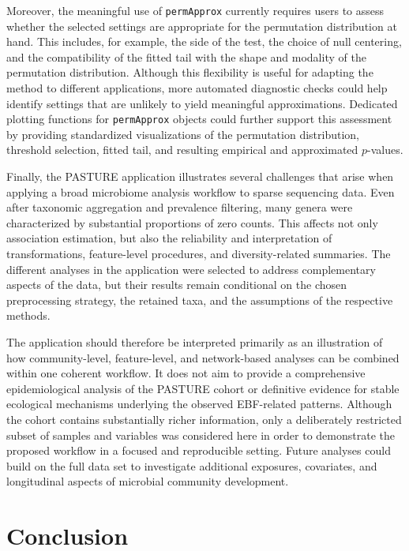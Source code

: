 Moreover, the meaningful use of \texttt{permApprox} currently requires users to assess whether the selected settings are appropriate for the permutation distribution at hand. This includes, for example, the side of the test, the choice of null centering, and the compatibility of the fitted tail with the shape and modality of the permutation distribution. Although this flexibility is useful for adapting the method to different applications, more automated diagnostic checks could help identify settings that are unlikely to yield meaningful approximations. Dedicated plotting functions for \texttt{permApprox} objects could further support this assessment by providing standardized visualizations of the permutation distribution, threshold selection, fitted tail, and resulting empirical and approximated $p$-values.

Finally, the PASTURE application illustrates several challenges that arise when applying a broad microbiome analysis workflow to sparse sequencing data. Even after taxonomic aggregation and prevalence filtering, many genera were characterized by substantial proportions of zero counts. This affects not only association estimation, but also the reliability and interpretation of transformations, feature-level procedures, and diversity-related summaries. The different analyses in the application were selected to address complementary aspects of the data, but their results remain conditional on the chosen preprocessing strategy, the retained taxa, and the assumptions of the respective methods.

The application should therefore be interpreted primarily as an illustration of how community-level, feature-level, and network-based analyses can be combined within one coherent workflow. It does not aim to provide a comprehensive epidemiological analysis of the PASTURE cohort or definitive evidence for stable ecological mechanisms underlying the observed EBF-related patterns. Although the cohort contains substantially richer information, only a deliberately restricted subset of samples and variables was considered here in order to demonstrate the proposed workflow in a focused and reproducible setting. Future analyses could build on the full data set to investigate additional exposures, covariates, and longitudinal aspects of microbial community development.

\section{Conclusion}

